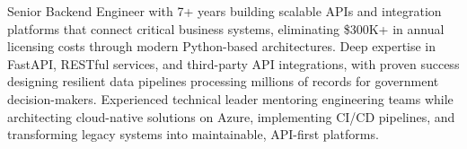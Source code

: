 
\begin{cvparagraph}
Senior Backend Engineer with 7+ years building scalable APIs and integration platforms that connect critical business systems, eliminating \$300K+ in annual licensing costs through modern Python-based architectures. Deep expertise in FastAPI, RESTful services, and third-party API integrations, with proven success designing resilient data pipelines processing millions of records for government decision-makers. Experienced technical leader mentoring engineering teams while architecting cloud-native solutions on Azure, implementing CI/CD pipelines, and transforming legacy systems into maintainable, API-first platforms.
\end{cvparagraph}